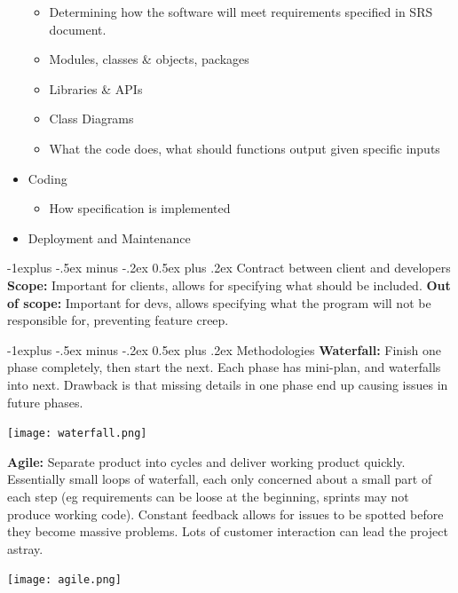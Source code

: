 \documentclass[letterpaper, 8pt]{extarticle}
\makeatletter
\renewcommand{\subsection}{\@startsection{subsection}{2}{0mm}%
                                {-1explus -.5ex minus -.2ex}%
                                {0.5ex plus .2ex}%
                                {\normalfont\small\bfseries}}
\makeatother
\begin{document}
\begin{multicols*}{5}
\begin{itemize}
          \begin{itemize}
            \item Determining how the software will meet requirements specified in SRS document.
            \item Modules, classes \& objects, packages
            \item Libraries \& APIs
            \item Class Diagrams
            \item What the code does, what should functions output given specific inputs
          \end{itemize}
    \item Coding
          \begin{itemize}
            \item How specification is implemented
          \end{itemize}
    \item Deployment and Maintenance
  \end{itemize}
  \subsection{Contract between client and developers}
  \textbf{Scope:} Important for clients, allows for specifying what should be included.
  \textbf{Out of scope:} Important for devs,
  allows specifying what the program will not be responsible for,
  preventing feature creep.

  \subsection{Methodologies}
  \textbf{Waterfall:} Finish one phase completely, then start the next.
  Each phase has mini-plan, and waterfalls into next.
  Drawback is that missing details in one phase
  end up causing issues in future phases.
  \begin{center}
      \texttt{[image: waterfall.png]}
  \end{center}

  \textbf{Agile:} Separate product into cycles
  and deliver working product quickly.
  Essentially small loops of waterfall,
  each only concerned about a small part of each step
  (eg requirements can be loose at the beginning, sprints may not produce working code).
  Constant feedback allows for issues to be spotted before they become massive problems.
  Lots of customer interaction can lead the project astray.
  \begin{center}
      \texttt{[image: agile.png]}
  \end{center}


\end{multicols*}
\end{document}

